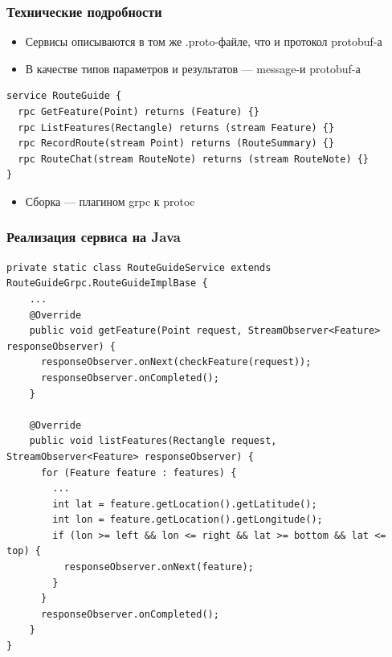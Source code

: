 \documentclass{../../slides-style}
\begin{document}
    \begin{frame}[fragile]
        \frametitle{Технические подробности}
        \begin{itemize}
            \item Сервисы описываются в том же .proto-файле, что и протокол protobuf-а
            \item В качестве типов параметров и результатов --- message-и protobuf-а
        \end{itemize}
        \begin{verbatim}
service RouteGuide {
  rpc GetFeature(Point) returns (Feature) {}
  rpc ListFeatures(Rectangle) returns (stream Feature) {}
  rpc RecordRoute(stream Point) returns (RouteSummary) {}
  rpc RouteChat(stream RouteNote) returns (stream RouteNote) {}
}
        \end{verbatim}
        \begin{itemize}
            \item Сборка --- плагином grpc к protoc
        \end{itemize}
\end{frame}

    \begin{frame}[fragile]
        \frametitle{Реализация сервиса на Java}
        \begin{scriptsize}
            \begin{verbatim}
private static class RouteGuideService extends RouteGuideGrpc.RouteGuideImplBase {
    ...
    @Override
    public void getFeature(Point request, StreamObserver<Feature> responseObserver) {
      responseObserver.onNext(checkFeature(request));
      responseObserver.onCompleted();
    }

    @Override
    public void listFeatures(Rectangle request, StreamObserver<Feature> responseObserver) {
      for (Feature feature : features) {
        ...
        int lat = feature.getLocation().getLatitude();
        int lon = feature.getLocation().getLongitude();
        if (lon >= left && lon <= right && lat >= bottom && lat <= top) {
          responseObserver.onNext(feature);
        }
      }
      responseObserver.onCompleted();
    }
}
            \end{verbatim}
        \end{scriptsize}
    \end{frame}
\end{document}
